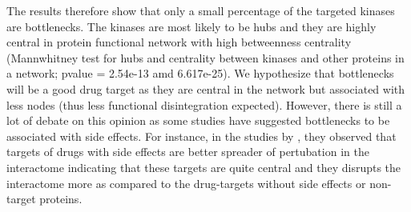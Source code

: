 \documentclass[a4paper, 11pt]{article}
\newcommand{\redcomment}[1]{\textcolor{red}{[#1]}} %
\begin{document}
The results therefore show that only a small percentage of the targeted kinases are bottlenecks. The kinases are most likely to be hubs and they are highly central in protein functional network with high betweenness centrality (Mannwhitney test for hubs and centrality between kinases and other proteins in a network; pvalue = 2.54e-13 amd 6.617e-25). We hypothesize that bottlenecks will be a good drug target as they are central in the network but associated with less nodes (thus less functional disintegration expected). However, there is still a lot of debate on this opinion as some studies have suggested bottlenecks to be associated with side effects.  For instance, in the studies by \cite{perez2015targets}, they observed that targets of drugs with side effects are better spreader of pertubation in the interactome indicating that these targets are quite central and they disrupts the interactome more as compared to the drug-targets without side effects or non-target proteins. %
\end{document}

